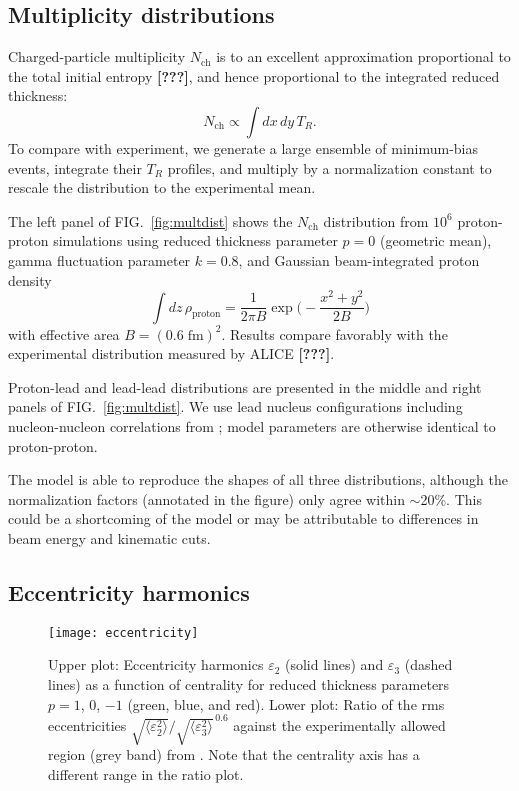 \documentclass[aps,prl,reprint,amsmath,nofootinbib]{revtex4-1}
\newcommand{\nch}{N_\text{ch}}
\newcommand{\eccratio}{\sqrt{\langle \varepsilon_2^2 \rangle}/\sqrt{\langle \varepsilon_3^2 \rangle}^{\,0.6}}
\newcommand{\needcite}{\textbf{[???]}}
\begin{document}
\subsection{Multiplicity distributions}

Charged-particle multiplicity $\nch$ is to an excellent approximation proportional to the total initial
entropy \needcite, and hence proportional to the integrated reduced thickness:
\begin{equation}
  \nch \propto \int dx \, dy \, T_R.
\end{equation}
To compare with experiment, we generate a large ensemble of minimum-bias events, integrate their $T_R$
profiles, and multiply by a normalization constant to rescale the distribution to the experimental mean.

The left panel of FIG.~\ref{fig:multdist} shows the $\nch$ distribution from $10^6$ proton-proton simulations
using reduced thickness parameter $p = 0$ (geometric mean), gamma fluctuation parameter $k = 0.8$, and
Gaussian beam-integrated proton density
\begin{equation}
  \int dz \, \rho_\text{proton} = \frac{1}{2\pi B} \exp\biggr( -\frac{x^2 + y^2}{2B} \biggr)
\end{equation}
with effective area $B = (0.6\;\text{fm})^2$.  Results compare favorably with the experimental distribution
measured by ALICE \needcite.

Proton-lead and lead-lead distributions are presented in the middle and right panels of
FIG.~\ref{fig:multdist}.  We use lead nucleus configurations including nucleon-nucleon correlations from
\cite{nucleon-correlations}; model parameters are otherwise identical to proton-proton.

The model is able to reproduce the shapes of all three distributions, although the normalization factors
(annotated in the figure) only agree within $\sim$20\%.  This could be a shortcoming of the model or may be
attributable to differences in beam energy and kinematic cuts.

\subsection{Eccentricity harmonics}

\begin{figure}[b]
  \texttt{[image: eccentricity]}
  \caption{
    \label{fig:eccen}
    Upper plot:  Eccentricity harmonics $\varepsilon_2$ (solid lines) and $\varepsilon_3$ (dashed lines) as a
    function of centrality for reduced thickness parameters $p = 1$, 0, $-1$ (green, blue, and red).  Lower
    plot:  Ratio of the rms eccentricities $\eccratio$ against the experimentally allowed region (grey band)
    from \cite{constraining-ic}.  Note that the centrality axis has a different range in the ratio plot.
  }
\end{figure}
\end{document}
